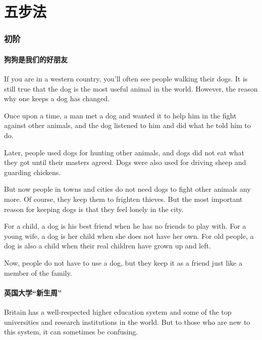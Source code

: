 \part{五步法}
\section{初阶}
\subsection{狗狗是我们的好朋友}

\begin{margintable}\vspace{-2cm}\footnotesize
{}
\end{margintable}


If you are in a western country, you'll often see people
walking their dogs. It is still true that the dog is the most
useful animal in the world. However, the reason why
one keeps a dog has changed.

Once upon a time, a man met a dog and wanted it to help
him in the fight against other animals, and the dog listened
to him and did what he told him to do.

Later, people used dogs for hunting other animals,
and dogs did not eat what they got until their masters
agreed. Dogs were also used for driving sheep and guarding
chickens.

But now people in towns and cities do not need dogs to
fight other animals any more. Of course, they keep them
to frighten thieves. But the most important reason for keeping dogs is that they feel lonely in the city.

For a child, a dog is his best friend when he has no friends
to play with. For a young wife, a dog is her child when she
does not have her own. For old people, a dog is also a
child when their real children have grown up and left.

Now, people do not have to use a dog, but they
keep it as a friend just like a member of the family.
\subsection{英国大学“新生周”}
\begin{margintable}\vspace{-2cm}\footnotesize
{}
\end{margintable}
Britain has a well-respected higher education system and
some of the top universities and research institutions in
the world. But to those who are new to this system, it can
sometimes be confusing.

